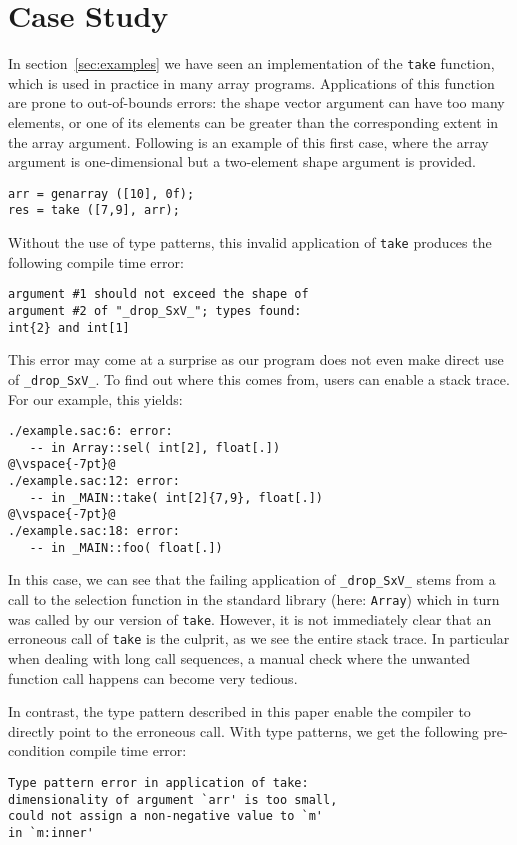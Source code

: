 
\section{Case Study}

In section~\ref{sec:examples} we have seen an implementation of the \texttt{take} function, which is used in practice in many array programs.
Applications of this function are prone to out-of-bounds errors: the shape vector argument can have too many elements, or one of its elements can be greater than the corresponding extent in the array argument.
Following is an example of this first case, where the array argument is one-dimensional but a two-element shape argument is provided.
\begin{lstlisting}
arr = genarray ([10], 0f);
res = take ([7,9], arr);
\end{lstlisting}

\noindent
Without the use of type patterns, this invalid application of \texttt{take} produces the following compile time error:
\begin{lstlisting}[language=console]
argument #1 should not exceed the shape of
argument #2 of "_drop_SxV_"; types found:
int{2} and int[1]
\end{lstlisting}

\noindent
This error may come at a surprise as our program does not even make direct use of \verb|_drop_SxV_|.
To find out where this comes from, users can enable a stack trace. For our example, this yields:
\begin{lstlisting}[language=console,escapechar=@]
./example.sac:6: error:
   -- in Array::sel( int[2], float[.])
@\vspace{-7pt}@
./example.sac:12: error:
   -- in _MAIN::take( int[2]{7,9}, float[.])
@\vspace{-7pt}@
./example.sac:18: error:
   -- in _MAIN::foo( float[.])
\end{lstlisting}

\noindent
In this case, we can see that the failing application of \verb|_drop_SxV_| stems from a call to the selection function
in the standard library (here: \verb|Array|) which in turn was called by our version of \verb|take|. However,
it is not immediately clear that an erroneous call of \verb|take| is the culprit, as we see the entire stack trace.
In particular when dealing with long call sequences, a manual check where the unwanted function call happens can become very tedious.

In contrast, the type pattern described in this paper enable the compiler to directly point to the erroneous call.
With type patterns, we get the following pre-condition compile time error:
\begin{lstlisting}[language=console]
Type pattern error in application of take:
dimensionality of argument `arr' is too small,
could not assign a non-negative value to `m'
in `m:inner'
\end{lstlisting}

